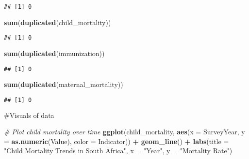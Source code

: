 \documentclass[
]{article}
\newenvironment{Shaded}{\begin{snugshade}}{\end{snugshade}}
\newcommand{\AttributeTok}[1]{\textcolor[rgb]{0.13,0.29,0.53}{#1}}
\newcommand{\CommentTok}[1]{\textcolor[rgb]{0.56,0.35,0.01}{\textit{#1}}}
\newcommand{\FunctionTok}[1]{\textcolor[rgb]{0.13,0.29,0.53}{\textbf{#1}}}
\newcommand{\NormalTok}[1]{#1}
\newcommand{\SpecialCharTok}[1]{\textcolor[rgb]{0.81,0.36,0.00}{\textbf{#1}}}
\newcommand{\StringTok}[1]{\textcolor[rgb]{0.31,0.60,0.02}{#1}}
\begin{document}
\begin{verbatim}
## [1] 0
\end{verbatim}

\begin{Shaded}
\begin{Highlighting}[]
\FunctionTok{sum}\NormalTok{(}\FunctionTok{duplicated}\NormalTok{(child\_mortality)) }
\end{Highlighting}
\end{Shaded}

\begin{verbatim}
## [1] 0
\end{verbatim}

\begin{Shaded}
\begin{Highlighting}[]
\FunctionTok{sum}\NormalTok{(}\FunctionTok{duplicated}\NormalTok{(immunization)) }
\end{Highlighting}
\end{Shaded}

\begin{verbatim}
## [1] 0
\end{verbatim}

\begin{Shaded}
\begin{Highlighting}[]
\FunctionTok{sum}\NormalTok{(}\FunctionTok{duplicated}\NormalTok{(maternal\_mortality)) }
\end{Highlighting}
\end{Shaded}

\begin{verbatim}
## [1] 0
\end{verbatim}

\#Visuals of data

\begin{Shaded}
\begin{Highlighting}[]
\CommentTok{\# Plot child mortality over time}
\FunctionTok{ggplot}\NormalTok{(child\_mortality, }\FunctionTok{aes}\NormalTok{(}\AttributeTok{x =}\NormalTok{ SurveyYear, }\AttributeTok{y =} \FunctionTok{as.numeric}\NormalTok{(Value), }\AttributeTok{color =}\NormalTok{ Indicator)) }\SpecialCharTok{+}
  \FunctionTok{geom\_line}\NormalTok{() }\SpecialCharTok{+}
  \FunctionTok{labs}\NormalTok{(}\AttributeTok{title =} \StringTok{"Child Mortality Trends in South Africa"}\NormalTok{, }\AttributeTok{x =} \StringTok{"Year"}\NormalTok{, }\AttributeTok{y =} \StringTok{"Mortality Rate"}\NormalTok{)}
\end{Highlighting}
\end{Shaded}
\end{document}

